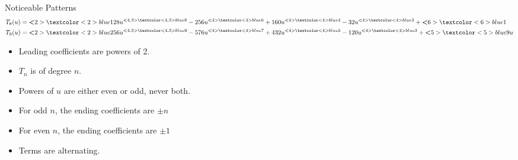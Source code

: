 \documentclass{beamer}
\begin{document}
\begin{frame}{Noticeable Patterns}
\begin{align*}
  T_8(u) & = \textbf<2>{\textcolor<2>{blue}{128}} u^{\textbf<4,3>{\textcolor<4,3>{blue}{8}}} - 256u^{\textbf<4>{\textcolor<4>{blue}{6}}} + 160u^{\textbf<4>{\textcolor<4>{blue}{4}}} - 32u^{\textbf<4>{\textcolor<4>{blue}{2}}} + \textbf<6>{\textcolor<6>{blue}{1}}    \\
  T_9(u) & = \textbf<2>{\textcolor<2>{blue}{256}} u^{\textbf<4,3>{\textcolor<4,3>{blue}{9}}} - 576u^{\textbf<4>{\textcolor<4>{blue}{7}}} + 432u^{\textbf<4>{\textcolor<4>{blue}{5}}} - 120u^{\textbf<4>{\textcolor<4>{blue}{3}}} + \textbf<5>{\textcolor<5>{blue}{9}} u
 \end{align*} \normalsize
 \vspace{-15pt}
 \hline
 \begin{itemize}
  \pause
  \item Leading coefficients are powers of 2. \pause
  \item $T_n$ is of degree $n$. \pause
  \item Powers of $u$ are either even or odd, never both. \pause
  \item For odd $n$, the ending coefficients are $\pm n$ \pause
  \item For even $n$, the ending coefficients are $\pm 1$ \pause
  \item Terms are alternating.
 \end{itemize}
\end{frame}
\end{document}
